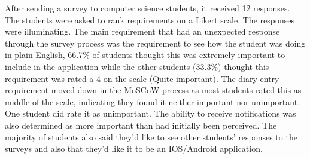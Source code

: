 \documentclass{l4proj}
\begin{document}
After sending a survey to computer science students, it received 12 responses. The students were asked to rank requirements on a Likert scale. The responses were illuminating. The main requirement that had an unexpected response through the survey process was the requirement to see how the student was doing in plain English, 66.7\% of students thought this was extremely important to include in the application while the other students (33.3\%) thought this requirement was rated a 4 on the scale (Quite important).  The diary entry requirement moved down in the MoSCoW process as most students rated this as middle of the scale, indicating they found it neither important nor unimportant. One student did rate it as unimportant. The ability to receive notifications was also determined as more important than had initially been perceived. The majority of students also said they’d like to see other students’ responses to the surveys and also that they’d like it to be an IOS/Android application.
\end{document}
